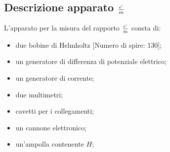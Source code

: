 \subsection{Descrizione apparato $\frac{e^{\textrm{-}}}{m}$}
L'apparato per la misura del rapporto $\frac{e^{\textrm{-}}}{m}$ consta di:
\begin{itemize}
\item due bobine di Helmholtz [Numero di spire: 130];
\item un generatore di differenza di potenziale elettrico;
\item un generatore di corrente;
\item due multimetri;
\item cavetti per i collegamenti;
\item un cannone elettronico;
\item un'ampolla contenente $H$;

\end{itemize}
